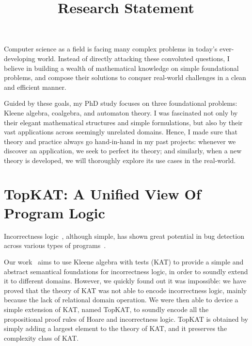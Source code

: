 \documentclass[11pt,a4paper,sans]{moderncv} %
\title{Research Statement}
\begin{document}
\makecvtitle %

\setlength\parskip{8px}

Computer science as a field is facing many complex problems in today's ever-developing world. 
Instead of directly attacking these convoluted questions, I believe in building a wealth of mathematical knowledge on simple foundational problems, and compose their solutions to conquer real-world challenges in a clean and efficient manner. 

Guided by these goals, my PhD study focuses on three foundational problems: Kleene algebra, coalgebra, and automaton theory. 
I was fascinated not only by their elegant mathematical structures and simple formulations, but also by their vast applications across seemingly unrelated domains. 
Hence, I made sure that theory and practice always go hand-in-hand in my past projects: whenever we discover an application, we seek to perfect its theory; and similarly, when a new theory is developed, we will thoroughly explore its use cases in the real-world.

\section{TopKAT: A Unified View Of Program Logic}

Incorrectness logic~\cite{ohearn_IncorrectnessLogic_2020}, although simple, has shown great potential in bug detection across various types of programs~\cite{raad_LocalReasoningPresence_2020,le_FindingRealBugs_2022, zhang_QuantitativeStrongestPost_2022b}.

Our work~\cite{zhang_IncorrectnessLogicKleene_2022} aims to use Kleene algebra with tests (KAT) to provide a simple and abstract semantical foundations for incorrectness logic, in order to soundly extend it to different domains. 
However, we quickly found out it was impossible: we have proved that the theory of KAT was not able to encode incorrectness logic, mainly because the lack of relational domain operation.
We were then able to device a simple extension of KAT, named TopKAT, to soundly encode all the propositional proof rules of Hoare and incorrectness logic. 
TopKAT is obtained by simply adding a largest element to the theory of KAT, and it preserves the complexity class of KAT.
\end{document}
